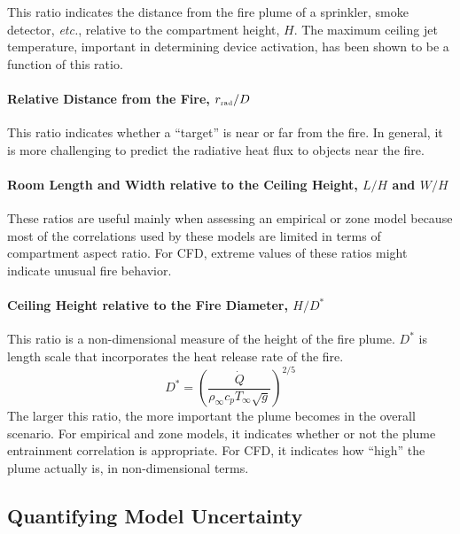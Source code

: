\documentclass[graybox]{svmult}
\begin{document}
This ratio indicates the distance from the fire plume of a sprinkler, smoke detector, {\em etc.}, relative to the
compartment height, $H$. The maximum ceiling jet temperature, important  in determining device activation, has been shown to be a function of this ratio.

\paragraph{Relative Distance from the Fire, $r_{\hbox{\tiny rad}}/D$}

This ratio indicates whether a ``target'' is near or far from the fire. In general, it is more challenging to predict the
radiative heat flux to objects near the fire.

\paragraph{Room Length and Width relative to the Ceiling Height, $L/H$ and $W/H$}

These ratios are useful mainly when assessing an empirical or zone model because most of the correlations used
by these models are limited in terms of compartment aspect ratio. For CFD, extreme values of these ratios might indicate unusual fire behavior.

\paragraph{Ceiling Height relative to the Fire Diameter, $H/D^*$}

This ratio is a non-dimensional measure of the height of the fire plume.
$D^*$ is length scale that incorporates the heat release rate of the fire.
\begin{equation}
   D^* = \left( \frac{\dot{Q}}{\rho_\infty c_p T_\infty \sqrt{g}} \right)^{2/5} \label{Dstar}
\end{equation}
The larger this ratio, the more important the plume becomes in the overall scenario. For empirical and zone models, it indicates whether or not the plume entrainment
correlation is appropriate. For CFD, it indicates how ``high'' the plume actually is, in non-dimensional terms.


\subsection{Quantifying Model Uncertainty}
\end{document}
